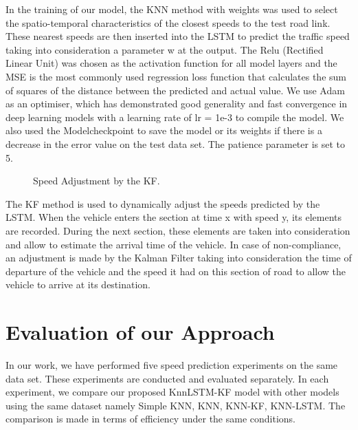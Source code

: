 In the training of our model, the KNN method with weights was used to select the spatio-temporal characteristics of the closest speeds to the test road link. These nearest speeds are then inserted into the LSTM to predict the traffic speed taking into consideration a parameter w at the output. The Relu (Rectified Linear Unit) was chosen as the activation function for all model layers and the MSE is the most commonly used regression loss function that calculates the sum of squares of the distance between the predicted and actual value. We use Adam as an optimiser, which has demonstrated good generality and fast convergence in deep learning models with a learning rate of lr = 1e-3 to compile the model. We also used the Modelcheckpoint to save the model or its weights if there is a decrease in the error value on the test data set. The patience parameter is set to 5.

\begin{figure}[!h]
	\begin{center}
	\end{center}
	\caption{Speed Adjustment by the KF.}
	\label{Speed Adjustment by the KF}
\end{figure}

The KF method is used to dynamically adjust the speeds predicted by the LSTM. When the vehicle enters the section at time x with speed y, its elements are recorded. During the next section, these elements are taken into consideration and allow to estimate the arrival time of the vehicle. In case of non-compliance, an adjustment is made by the Kalman Filter taking into consideration the time of departure of the vehicle and the speed it had on this section of road to allow the vehicle to arrive at its destination.  


\section{Evaluation of our Approach}

In our work, we have performed five speed prediction experiments on the same data set. These experiments are conducted and evaluated separately. In each experiment, we compare our proposed KnnLSTM-KF model with other models using the same dataset namely Simple KNN, KNN, KNN-KF, KNN-LSTM. The comparison is made in terms of efficiency under the same conditions.

